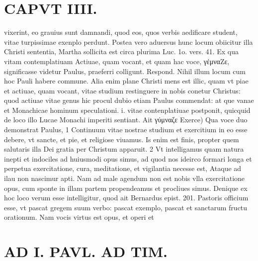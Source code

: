 \documentclass{article}
\begin{document}
\begin{pages}
\section*{CAPVT  IIII. }
\marginpar{[ p.205 ]}\pstart vixerint, eo grauius sunt damnandi, quod eos, quos verbis aedificare student, vitae turpissimae exenplo perdunt. Postea vero aduersus hunc locum obiicitur illa Christi sententia, Martha sollicita est circa plurima Luc. 1o. vers. 41. Ex qua vitam contemplatiuam Actiuae, quam vocant, et quam hac voce, γέμναZε, significasse videtur Paulus, praeferri colligunt. Respond. Nihil illum locum cum hoc Pauli habere commune. Alia enim plane Christi mens est illic, quam vt piae et actiuae, quam vocant, vitae studium restinguere in nobis conetur Christus: quod actiuae vitae genus hic procul dubio etiam Paulus commendat: at que vanae et Monachicae hominum speculationi. i. vitae contenplatiuae postponit, quicquid de loco illo Lucae Monachi imperiti sentiant. Ait γύμναζε Exerce) Qua voce duo demonstrat Paulus, 1 Continuum vitae nostrae studium et exercitium in eo esse debere, vt sancte, et pie, et religiose viuamus. Is enim est finis, propter quem salutaris illa Dei gratia per Christum apparuit. 2 Vt intelligamus quam natura inepti et indociles ad huiusmodi opus simus, ad quod nos ideirco formari longa et perpetua exercitatione, cura, meditatione, et vigilantia necesse est, Ataque ad ilau non nascimur apti. Nam ad male agendum non est nobis vlla exercitatione opus, cum sponte in illam partem propendeamus et procliues simus. Denique ex hoc loco verum esse intelligitur, quod ait Bernardus epist. 201. Pastoris officium esse, vt pascat gregem suum verbo: pascat exemplo, pascat et sanctarum fructu orationum. Nam vocis virtus est opus, et operi et  \pend
\section*{AD I. PAVL. AD TIM. }
\marginpar{[ p.206 ]}\pstart {}
{}

\end{pages}
\end{document}
